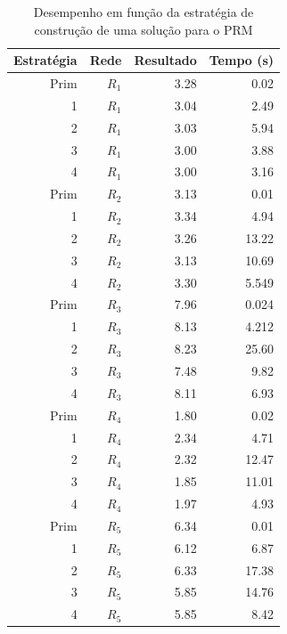 \begin{table}[!htbp]
	\centering
	\caption{Desempenho em função da estratégia de construção de uma solução para o PRM}
	\label{tab_exp2_estrategias}
	\begin{tabular}{rrrr}
		Estratégia & Rede & Resultado   & Tempo (s)    \\ \hline
		Prim       & $R_1$   & 3.28 & 0.02     \\
		1          & $R_1$   & 3.04 & 2.49     \\
		2          & $R_1$   & 3.03 & 5.94      \\
		\rowcolor{table-green} 
		3          & $R_1$   & 3.00 & 3.88      \\
		\rowcolor{table-green} 
		4          & $R_1$   & 3.00 & 3.16      \\ \hline
		Prim       & $R_2$   & 3.13 & 0.01     \\
		1          & $R_2$   & 3.34 & 4.94     \\
		2          & $R_2$   & 3.26 & 13.22     \\
		\rowcolor{table-green} 
		3          & $R_2$   & 3.13 & 10.69    \\
		4          & $R_2$   & 3.30 & 5.549     \\ \hline
		Prim       & $R_3$   & 7.96 & 0.024     \\
		1          & $R_3$   & 8.13 & 4.212     \\
		2          & $R_3$   & 8.23 & 25.60    \\
		\rowcolor{table-green} 
		3          & $R_3$   & 7.48 & 9.82     \\
		4          & $R_3$   & 8.11 & 6.93     \\ \hline
		Prim       & $R_4$   & 1.80 & 0.02     \\
		1          & $R_4$   & 2.34 & 4.71     \\
		2          & $R_4$   & 2.32 & 12.47    \\
		\rowcolor{table-green} 
		3          & $R_4$   & 1.85 & 11.01    \\
		4          & $R_4$   & 1.97 & 4.93     \\ \hline
		Prim       & $R_5$   & 6.34 & 0.01     \\
		1          & $R_5$   & 6.12 & 6.87      \\
		2          & $R_5$   & 6.33 & 17.38     \\
		\rowcolor{table-green} 
		3          & $R_5$   & 5.85 & 14.76    \\
		\rowcolor{table-green} 
		4          & $R_5$   & 5.85 & 8.42     \\ \hline
	\end{tabular}
\end{table}

